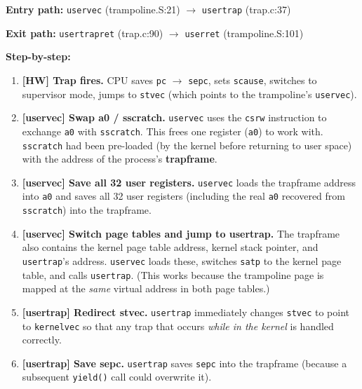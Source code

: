 \documentclass[11pt, a4paper]{article}
\begin{document}
\begin{tcolorbox}[lifecycle, title={User-Space Trap Lifecycle}]

\textbf{Entry path:} \lstinline|uservec| (trampoline.S:21) $\to$ \lstinline|usertrap| (trap.c:37)

\textbf{Exit path:} \lstinline|usertrapret| (trap.c:90) $\to$ \lstinline|userret| (trampoline.S:101)

\medskip
\textbf{Step-by-step:}

\begin{enumerate}[leftmargin=1.8em, itemsep=0.3em]

  \item \textbf{[HW] Trap fires.}
        CPU saves \lstinline|pc| $\to$ \lstinline|sepc|, sets \lstinline|scause|, switches to supervisor mode, jumps to \lstinline|stvec| (which points to the trampoline's \lstinline|uservec|).

  \item \textbf{[uservec] Swap a0 / sscratch.}
        \lstinline|uservec| uses the \lstinline|csrw| instruction to exchange \lstinline|a0| with \lstinline|sscratch|.
        This frees one register (\lstinline|a0|) to work with. \lstinline|sscratch| had been pre-loaded (by the kernel before returning to user space) with the address of the process's \textbf{trapframe}.

  \item \textbf{[uservec] Save all 32 user registers.}
        \lstinline|uservec| loads the trapframe address into \lstinline|a0| and saves all 32 user registers (including the real \lstinline|a0| recovered from \lstinline|sscratch|) into the trapframe.

  \item \textbf{[uservec] Switch page tables and jump to usertrap.}
        The trapframe also contains the kernel page table address, kernel stack pointer, and \lstinline|usertrap|'s address. \lstinline|uservec| loads these, switches \lstinline|satp| to the kernel page table, and calls \lstinline|usertrap|.
        (This works because the trampoline page is mapped at the \emph{same} virtual address in both page tables.)

  \item \textbf{[usertrap] Redirect stvec.}
        \lstinline|usertrap| immediately changes \lstinline|stvec| to point to \lstinline|kernelvec| so that any trap that occurs \emph{while in the kernel} is handled correctly.

  \item \textbf{[usertrap] Save sepc.}
        \lstinline|usertrap| saves \lstinline|sepc| into the trapframe (because a subsequent \lstinline|yield()| call could overwrite it).


\end{enumerate}
\end{tcolorbox}
\end{document}
